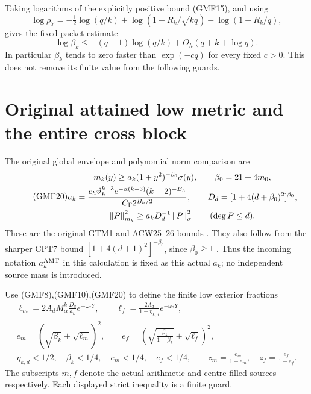\documentclass[11pt,a4paper]{article}
\begin{document}
Taking logarithms of the explicitly positive bound (GMF15),
and using
\[
 \log\rho_Y
 =-\tfrac12\log(q/k)
   +\log(1+R_k/\sqrt{kq})-\log(1-R_k/q),
\]
gives the fixed-packet estimate
\begin{equation}\tag{GMF19}
 \log\beta_k
 \le-(q-1)\log(q/k)+O_h(q+k+\log q).
\end{equation}
In particular \(\beta_k\) tends to zero faster than
\(\exp(-c q)\) for every fixed \(c>0\).
This does not remove its finite value from the following guards.

\section{Original attained low metric and the entire cross block}

The original global envelope and polynomial norm comparison are
\begin{equation}\tag{GMF20}
\begin{gathered}
 m_k(y)\ge a_k(1+y^2)^{-\beta_0}\sigma(y),\qquad
 \beta_0=21+4m_0,\\
 a_k=\frac{c_h\vartheta_h^{k-3}e^{-\alpha(k-3)}(k-2)^{-B_h}}
                 {C_\Gamma 2^{B_h/2}},\qquad
 D_d=[1+4(d+\beta_0)^2]^{\beta_0},\\
 \left\lVert P\right\rVert_{m_k}^2\ge a_kD_d^{-1}\left\lVert P\right\rVert_\sigma^2
                    \qquad(\deg P\le d).
\end{gathered}
\end{equation}
These are the original GTM1 and ACW25--26 bounds
\cite{a02gmf:providers,a02gmf:centralProvider}.  They also follow from
the sharper CPT7 bound
\([1+4(d+1)^2]^{-\beta_0}\), since \(\beta_0\ge1\)
\cite{a02gmf:cpt}.  Thus the incoming notation \(a_k^{\rm AMT}\)
in this calculation is fixed as this actual \(a_k\); no
independent source mass is introduced.

Use (GMF8),(GMF10),(GMF20) to define the finite low exterior
fractions
\begin{equation}\tag{GMF21}
\begin{gathered}
 \ell_m=
 2A_dM_\alpha^k\frac{D_d}{a_k}e^{-\omega_*Y},\qquad
 \ell_f=\frac{2A_d}{1-\eta_{k,d}}e^{-\omega_*Y},\\
 e_m=(\sqrt{\beta_k}+\sqrt{\ell_m})^2,\qquad
 e_f=\left(\sqrt{\frac{\beta_k}{1-\beta_k}}
                              +\sqrt{\ell_f}\right)^2,\\
 \eta_{k,d}<1/2,\quad \beta_k<1/4,\quad
 e_m<1/4,\quad e_f<1/4,\qquad
 z_m=\frac{e_m}{1-e_m},\quad z_f=\frac{e_f}{1-e_f}.
\end{gathered}
\end{equation}
The subscripts \(m,f\) denote the actual arithmetic and
centre-filled sources respectively.
Each displayed strict inequality is a finite guard.
\end{document}
